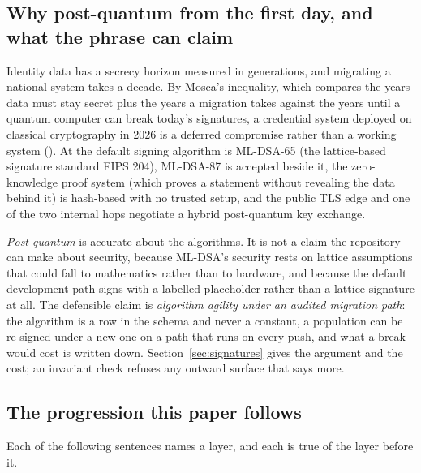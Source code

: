 \subsection{Why post-quantum from the first day, and what the phrase can claim}

Identity data has a secrecy horizon measured in generations, and migrating a national system takes
a decade. By Mosca's inequality, which compares the years data must stay secret plus the years a
migration takes against the years until a quantum computer can break today's signatures, a credential
system deployed on classical cryptography in 2026 is a deferred compromise rather than a working
system (\evidencerecord). At
 the default signing algorithm is ML-DSA-65 (the lattice-based signature standard FIPS 204), ML-DSA-87 is accepted beside
it, the zero-knowledge proof system (which proves a statement without revealing the data behind it) is hash-based with no trusted setup, and the public TLS edge and
one of the two internal hops negotiate a hybrid post-quantum key exchange.

\emph{Post-quantum} is accurate about the algorithms. It is not a claim the
repository can make about security, because ML-DSA's security rests on lattice assumptions that could
fall to mathematics rather than to hardware, and because the default development path signs with a
labelled placeholder rather than a lattice signature at all. The defensible claim is \emph{algorithm
agility under an audited migration path}: the algorithm is a row in the schema and never a constant,
a population can be re-signed under a new one on a path that runs on every push, and what a break
would cost is written down. Section~\ref{sec:signatures} gives the argument and the cost; an
invariant check refuses any outward surface that says more.

\subsection{The progression this paper follows}

Each of the following sentences names a layer, and each is true of the layer before it.


